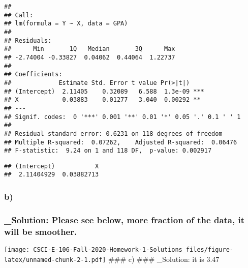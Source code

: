 \documentclass[
]{article}
\newenvironment{Shaded}{\begin{snugshade}}{\end{snugshade}}
\newcommand{\DataTypeTok}[1]{\textcolor[rgb]{0.13,0.29,0.53}{#1}}
\newcommand{\KeywordTok}[1]{\textcolor[rgb]{0.13,0.29,0.53}{\textbf{#1}}}
\newcommand{\NormalTok}[1]{#1}
\newcommand{\OperatorTok}[1]{\textcolor[rgb]{0.81,0.36,0.00}{\textbf{#1}}}
\newcommand{\StringTok}[1]{\textcolor[rgb]{0.31,0.60,0.02}{#1}}
\begin{document}
\begin{verbatim}
## 
## Call:
## lm(formula = Y ~ X, data = GPA)
## 
## Residuals:
##      Min       1Q   Median       3Q      Max 
## -2.74004 -0.33827  0.04062  0.44064  1.22737 
## 
## Coefficients:
##             Estimate Std. Error t value Pr(>|t|)    
## (Intercept)  2.11405    0.32089   6.588  1.3e-09 ***
## X            0.03883    0.01277   3.040  0.00292 ** 
## ---
## Signif. codes:  0 '***' 0.001 '**' 0.01 '*' 0.05 '.' 0.1 ' ' 1
## 
## Residual standard error: 0.6231 on 118 degrees of freedom
## Multiple R-squared:  0.07262,    Adjusted R-squared:  0.06476 
## F-statistic:  9.24 on 1 and 118 DF,  p-value: 0.002917
\end{verbatim}

\begin{Shaded}
\end{Shaded}

\begin{verbatim}
## (Intercept)           X 
##  2.11404929  0.03882713
\end{verbatim}

\hypertarget{b}{%
\subsubsection{b)}\label{b}}

\hypertarget{solution-please-see-below-more-fraction-of-the-data-it-will-be-smoother.}{%
\subsubsection{\_Solution: Please see below, more fraction of the data,
it will be
smoother.}\label{solution-please-see-below-more-fraction-of-the-data-it-will-be-smoother.}}

\begin{Shaded}
\end{Shaded}

\texttt{[image: CSCI-E-106-Fall-2020-Homework-1-Solutions\_files/figure-latex/unnamed-chunk-2-1.pdf]}
\#\#\# c) \#\#\# \_Solution: it is 3.47
\end{document}
